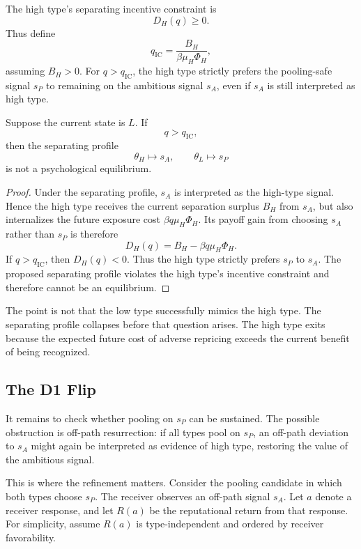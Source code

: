 The high type's separating incentive constraint is
\[
D_H(q)\ge 0.
\]
Thus define
\[
q_{\mathrm{IC}}=\frac{B_H}{\beta\mu_H\Phi_H},
\]
assuming \(B_H>0\). For \(q>q_{\mathrm{IC}}\), the high type strictly prefers the pooling-safe signal \(s_P\) to remaining on the ambitious signal \(s_A\), even if \(s_A\) is still interpreted as high type.

\begin{lemma}
\label{lem:anticipatory-failure}
Suppose the current state is \(L\). If
\[
q>q_{\mathrm{IC}},
\]
then the separating profile
\[
\theta_H\mapsto s_A,
\qquad
\theta_L\mapsto s_P
\]
is not a psychological equilibrium.
\end{lemma}

\begin{proof}
Under the separating profile, \(s_A\) is interpreted as the high-type signal. Hence the high type receives the current separation surplus \(B_H\) from \(s_A\), but also internalizes the future exposure cost \(\beta q\mu_H\Phi_H\). Its payoff gain from choosing \(s_A\) rather than \(s_P\) is therefore
\[
D_H(q)=B_H-\beta q\mu_H\Phi_H.
\]
If \(q>q_{\mathrm{IC}}\), then \(D_H(q)<0\). Thus the high type strictly prefers \(s_P\) to \(s_A\). The proposed separating profile violates the high type's incentive constraint and therefore cannot be an equilibrium.
\end{proof}

The point is not that the low type successfully mimics the high type. The separating profile collapses before that question arises. The high type exits because the expected future cost of adverse repricing exceeds the current benefit of being recognized.

\subsection{The D1 Flip}
\label{subsec:d1-flip}

It remains to check whether pooling on \(s_P\) can be sustained. The possible obstruction is off-path resurrection: if all types pool on \(s_P\), an off-path deviation to \(s_A\) might again be interpreted as evidence of high type, restoring the value of the ambitious signal.

This is where the refinement matters. Consider the pooling candidate in which both types choose \(s_P\). The receiver observes an off-path signal \(s_A\). Let \(a\) denote a receiver response, and let \(R(a)\) be the reputational return from that response. For simplicity, assume \(R(a)\) is type-independent and ordered by receiver favorability.

